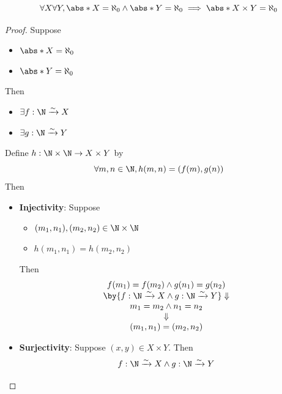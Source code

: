 \bigskip

\begin{theorem} \label{an:thm:product-of-two-countable-sets-is-countable}
  \[
    \forall X \forall Y, \abs*{X} = \aleph_{0} \land \abs*{Y} = \aleph_{0}
    \implies \abs*{X \times Y} = \aleph_{0}
  \]
\end{theorem}

\begin{proof}
  Suppose
  \begin{itemize}
    \item $\abs*{X} = \aleph_{0}$
    \item $\abs*{Y} = \aleph_{0}$
  \end{itemize}
  Then
  \begin{itemize}
    \item $\exists f: \N \xrightarrow{\sim} X$
    \item $\exists g: \N \xrightarrow{\sim} Y$
  \end{itemize}
  Define $h: \N \times \N \to X \times Y$ by
  \[
    \forall m, n \in \N, h(m, n) = (f(m), g(n))
  \]
  Then
  \begin{itemize}
    \item \textbf{Injectivity}: Suppose
          \begin{itemize}
            \item $(m_{1}, n_{1}), (m_{2}, n_{2}) \in \N \times \N$
            \item $h(m_{1}, n_{1}) = h(m_{2}, n_{2})$
          \end{itemize}
          Then
          \[
            \begin{array}{c}
              f(m_{1}) = f(m_{2}) \land g(n_{1}) = g(n_{2})                                          \\
              \by{\ensuremath{f:\N \xrightarrow{\sim} X \land g:\N \xrightarrow{\sim} Y}} \Downarrow \\
              m_{1} = m_{2} \land n_{1} = n_{2}                                                      \\
              \Downarrow                                                                             \\
              (m_{1}, n_{1}) = (m_{2}, n_{2})
            \end{array}
          \]
    \item \textbf{Surjectivity}: Suppose $(x, y) \in X \times Y$. Then
          \[
            \begin{array}{c}
              f: \N \xrightarrow{\sim} X \land g: \N \xrightarrow{\sim} Y \\

\end{array}\]
\end{itemize}
\end{proof}
